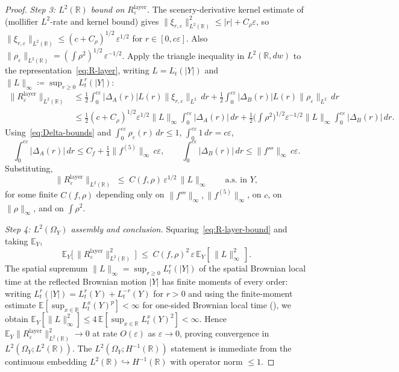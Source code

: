 \documentclass[11pt,reqno]{amsart}
\theoremstyle{plain}
\theoremstyle{definition}
\theoremstyle{remark}
\newcommand{\R}{\mathbb{R}}
\newcommand{\E}{\mathbb{E}}
\begin{document}
\begin{proof}
\emph{Step 3: $L^{2}(\R)$ bound on $R_{\varepsilon}^{\mathrm{layer}}$.}
The scenery-derivative kernel estimate
of~\cite{Fontes-EnergyFirst} (mollifier $L^{2}$-rate and kernel
bound) gives
$\|\xi_{r,\varepsilon}\|_{L^{2}(\R)}^{2}\le|r|+C_{\rho}\varepsilon$,
so
$\|\xi_{r,\varepsilon}\|_{L^{2}(\R)}\le(c+C_{\rho})^{1/2}\,\varepsilon^{1/2}$
for $r\in[0,c\varepsilon]$. Also
$\|\rho_{\varepsilon}\|_{L^{2}(\R)}=(\int\rho^{2})^{1/2}\,\varepsilon^{-1/2}$.
Apply the triangle inequality in $L^{2}(\R,dw)$ to the
representation~\eqref{eq:R-layer}, writing $L=L_{t}^{\cdot}(|Y|)$
and $\|L\|_{\infty}\coloneqq\sup_{r\ge 0}L_{t}^{r}(|Y|)$:
\begin{align*}
 \|R_{\varepsilon}^{\mathrm{layer}}\|_{L^{2}(\R)}
 &\le\tfrac12\!\int_{0}^{c\varepsilon}\!|\Delta_{A}(r)|L(r)\|\xi_{r,\varepsilon}\|_{L^{2}}\,dr
  +\tfrac12\!\int_{0}^{c\varepsilon}\!|\Delta_{B}(r)|L(r)\|\rho_{\varepsilon}\|_{L^{2}}\,dr\\
 &\le\tfrac12(c+C_{\rho})^{1/2}\varepsilon^{1/2}\|L\|_{\infty}\!\int_{0}^{c\varepsilon}\!|\Delta_{A}(r)|\,dr
  +\tfrac12\bigl(\textstyle\int\rho^{2}\bigr)^{1/2}\varepsilon^{-1/2}\|L\|_{\infty}\!\int_{0}^{c\varepsilon}\!|\Delta_{B}(r)|\,dr.
\end{align*}
Using~\eqref{eq:Delta-bounds} and
$\int_{0}^{c\varepsilon}\rho_{\varepsilon}(r)\,dr\le 1$,
$\int_{0}^{c\varepsilon}1\,dr=c\varepsilon$,
\[
 \int_{0}^{c\varepsilon}|\Delta_{A}(r)|\,dr\le C_{f}+\tfrac14\|f^{(5)}\|_{\infty}\,c\varepsilon,
 \qquad
 \int_{0}^{c\varepsilon}|\Delta_{B}(r)|\,dr\le\|f'''\|_{\infty}\,c\varepsilon.
\]
Substituting,
\begin{equation}\label{eq:R-layer-bound}
 \|R_{\varepsilon}^{\mathrm{layer}}\|_{L^{2}(\R)}
 \;\le\;C(f,\rho)\,\varepsilon^{1/2}\,\|L\|_{\infty}
 \qquad\text{a.s.\ in }Y,
\end{equation}
for some finite $C(f,\rho)$ depending only on
$\|f'''\|_{\infty},\|f^{(5)}\|_{\infty}$, on $c$, on $\|\rho\|_{\infty}$,
and on $\int\rho^{2}$.

\emph{Step 4: $L^{2}(\Omega_{Y})$ assembly and conclusion.}
Squaring~\eqref{eq:R-layer-bound} and taking $\E_{Y}$,
\[
 \E_{Y}\!\bigl[\,\|R_{\varepsilon}^{\mathrm{layer}}\|_{L^{2}(\R)}^{2}\,\bigr]
 \;\le\;C(f,\rho)^{2}\,\varepsilon\,\E_{Y}[\,\|L\|_{\infty}^{2}\,].
\]
The spatial supremum $\|L\|_{\infty}=\sup_{r\ge 0}L_{t}^{r}(|Y|)$
of the spatial Brownian local time at the reflected Brownian motion
$|Y|$ has finite moments of every order: writing
$L_{t}^{r}(|Y|)=L_{t}^{r}(Y)+L_{t}^{-r}(Y)$ for $r>0$ and using the
finite-moment estimate
$\E[\sup_{x\in\R}L_{t}^{x}(Y)^{p}]<\infty$ for one-sided Brownian
local time (\cite[Theorem 9.4.1]{MarcusRosen}), we obtain
$\E_{Y}[\|L\|_{\infty}^{2}]\le 4\,\E[\sup_{x\in\R}L_{t}^{x}(Y)^{2}]<\infty$.
Hence
$\E_{Y}\|R_{\varepsilon}^{\mathrm{layer}}\|_{L^{2}(\R)}^{2}\to 0$ at
rate $O(\varepsilon)$ as $\varepsilon\to 0$, proving convergence in
$L^{2}(\Omega_{Y};L^{2}(\R))$. The $L^{2}(\Omega_{Y};H^{-1}(\R))$
statement is immediate from the continuous embedding
$L^{2}(\R)\hookrightarrow H^{-1}(\R)$ with operator norm $\le 1$.
\end{proof}
\end{document}
